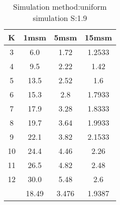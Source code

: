\begin{table}[H]
\centering
\begin{tabular}{c|ccc}
K &1msm &5msm &15msm\\
\hline
3 & 6.0 & 1.72 & 1.2533\\
4 & 9.5 & 2.22 & 1.42\\
5 & 13.5 & 2.52 & 1.6\\
6 & 15.3 & 2.8 & 1.7933\\
7 & 17.9 & 3.28 & 1.8333\\
8 & 19.7 & 3.64 & 1.9933\\
9 & 22.1 & 3.82 & 2.1533\\
10 & 24.4 & 4.46 & 2.26\\
11 & 26.5 & 4.82 & 2.48\\
12 & 30.0 & 5.48 & 2.6\\
\hline
& 18.49 & 3.476 & 1.9387\\
\end{tabular}
\caption{Simulation method:uniform simulation S:1.9}
\label{tab:s1.9}
\end{table}
